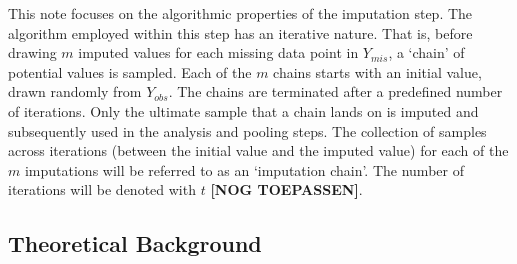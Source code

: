 \documentclass[article]{jss}
\begin{document}
This note focuses on the algorithmic properties of the imputation step. The algorithm employed within this step has an iterative nature. That is, before drawing $m$ imputed values for each missing data point in $Y_{mis}$, a `chain' of potential values is sampled. Each of the $m$ chains starts with an initial value, drawn randomly from $Y_{obs}$. The chains are terminated after a predefined number of iterations. Only the ultimate sample that a chain lands on is imputed and subsequently used in the analysis and pooling steps. The collection of samples across iterations (between the initial value and the imputed value) for each of the $m$ imputations will be referred to as an `imputation chain'. The number of iterations will be denoted with $t$ \textbf{[NOG TOEPASSEN]}.


% 
% 

\subsection{Theoretical Background} \label{sec:background}
\end{document}
